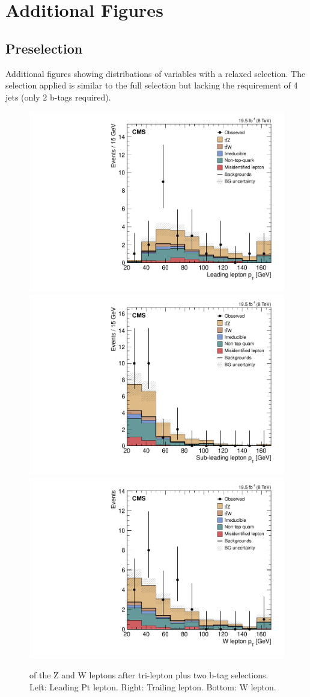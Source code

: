 \chapter{Additional Figures}
\label{app:figures}


\section{\ttZ Preselection}
Additional figures showing distribations of variables with a relaxed selection. The selection applied is similar to the full selection but lacking the requirement of 4 jets (only 2 b-tags required). 
\begin{figure}[h]
\begin{center}
\includegraphics[width=0.48\linewidth]{Figs/Plots_PreSelections/hZLep1Pt_3L2b.pdf}
\includegraphics[width=0.48\linewidth]{Figs/Plots_PreSelections/hZLep2Pt_3L2b.pdf}
\includegraphics[width=0.48\linewidth]{Figs/Plots_PreSelections/hWLepPt_3L2b.pdf}
\caption{\label{fig:hleppt_3L2b}
\pt of the Z and W leptons after tri-lepton plus two b-tag selections. Left: Leading Pt lepton. Right: Trailing \pt lepton. Bottom: W lepton.
}
\end{center}
\end{figure}




